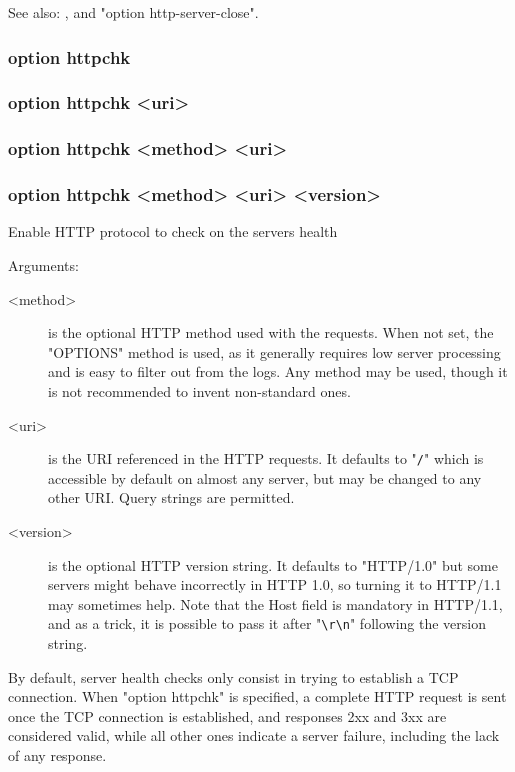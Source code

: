   See also: ,  and "option
             http-server-close".


\subsubsection[option httpchk]{option httpchk}
\subsubsection*{option httpchk <uri>}
\subsubsection*{option httpchk <method> <uri>}
\subsubsection*{option httpchk <method> <uri> <version>}


  Enable HTTP protocol to check on the servers health


  Arguments:
\begin{description}
\item[<method>]  is the optional HTTP method used with the requests. When not set,
              the "OPTIONS" method is used, as it generally requires low server
              processing and is easy to filter out from the logs. Any method
              may be used, though it is not recommended to invent non-standard
              ones.

\item[<uri>]     is the URI referenced in the HTTP requests. It defaults to "\verb|/|"
              which is accessible by default on almost any server, but may be
              changed to any other URI. Query strings are permitted.

\item[<version>] is the optional HTTP version string. It defaults to "HTTP/1.0"
              but some servers might behave incorrectly in HTTP 1.0, so turning
              it to HTTP/1.1 may sometimes help. Note that the Host field is
              mandatory in HTTP/1.1, and as a trick, it is possible to pass it
              after "\verb|\r\n|" following the version string.
\end{description}

  By default, server health checks only consist in trying to establish a TCP
  connection. When "option httpchk" is specified, a complete HTTP request is
  sent once the TCP connection is established, and responses 2xx and 3xx are
  considered valid, while all other ones indicate a server failure, including
  the lack of any response.

